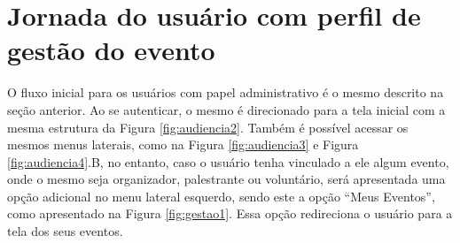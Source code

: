 \section{Jornada do usuário com perfil de gestão do evento}

O fluxo inicial para os usuários com papel administrativo é o mesmo descrito na seção anterior. Ao se autenticar, o mesmo é direcionado para a tela inicial com a mesma estrutura da Figura \ref{fig:audiencia2}. Também é possível acessar os mesmos menus laterais, como na Figura \ref{fig:audiencia3} e Figura \ref{fig:audiencia4}.B, no entanto, caso o usuário tenha vinculado a ele algum evento, onde o mesmo seja organizador, palestrante ou voluntário, será apresentada uma opção adicional no menu lateral esquerdo, sendo este a opção “Meus Eventos”, como apresentado na Figura \ref{fig:gestao1}. Essa opção redireciona o usuário para a tela dos seus eventos.

